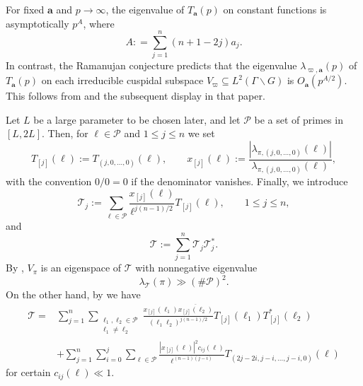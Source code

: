 \documentclass[11pt,oneside]{amsart}
\numberwithin{equation}{section}
\theoremstyle{remark}
\theoremstyle{plain}
\newcommand{\mcP}{\mathcal{P}}
\newcommand{\mcT}{\mathcal{T}}
\newcommand{\ba}{\mathbf{a}}
\newcommand\ov{\overline}
\newcommand\bs{\backslash}
\renewcommand\leq{\leqslant}
\begin{document}
For fixed $\ba$ and $p\to\infty$, the eigenvalue of $T_{\ba}(p)$ on constant functions is asymptotically $p^A$, where
\begin{equation}\label{Hecke-norm}
A: = \sum_{j=1}^n (n+1-2j) a_j.
\end{equation}
In contrast, the Ramanujan conjecture predicts that the eigenvalue $\lambda_{\varpi,\ba}(p)$ of $T_{\ba}(p)$ on each irreducible cuspidal subspace $V_\varpi\subseteq L^2(\Gamma \bs G)$ is $O_\ba(p^{A/2})$. This follows from \cite[(4.3)]{BM-IMRN} and the subsequent display in that paper.

Let $L$ be a large parameter to be chosen later, and let $\mcP$ be a set of primes in $[L,2L]$. Then, for $\ell\in\mcP$ and $1\leq j\leq n$ we set
\[
T_{[j]}(\ell):=T_{(j,0,\dotsc,0)}(\ell),\qquad
x_{[j]}(\ell):=\frac{|\lambda_{\pi,(j,0,\dotsc,0)}(\ell)|}{\lambda_{\pi,(j,0,\dotsc,0)}(\ell)},
\]
with the convention $0/0=0$ if the denominator vanishes. Finally, we introduce
\[
\mcT_j:= \sum_{\ell\in\mcP} \frac{x_{[j]}(\ell)}{\ell^{j(n-1)/2}} T_{[j]}(\ell),\qquad 1\leq j\leq n,
\]
and
\[
\mcT:=\sum_{j=1}^n \mcT_j \mcT_j^{\ast}.
\]
By \cite[Cor.~4.3]{BM-IMRN}, $V_{\pi}$ is an eigenspace of $\mcT$ with nonnegative eigenvalue
\begin{equation}\label{eigen-TT}
\lambda_{\mcT}(\pi)\gg (\#\mcP)^2.
\end{equation}
On the other hand, by \cite[Lem.~4.4]{BM-IMRN} we have
\begin{align*}
\mcT = & \sum_{j=1}^{n} \sum_{\substack{\ell_1,\ell_2\in\mcP \\ \ell_1\neq\ell_2}} \frac{x_{[j]}(\ell_1)\ov{{x}_{[j]}(\ell_2)} }{(\ell_1\ell_2)^{j(n-1)/2}}T_{[j]}(\ell_1)T^{\ast}_{[j]}(\ell_2) \\ & + \sum_{j=1}^{n} \sum_{i=0}^j \sum_{\ell \in \mcP} \frac{|x_{[j]}(\ell)|^2 c_{ij}(\ell)}{\ell^{(n-1)(j-i)}}T_{(2j-2i, j-i, \ldots, j-i, 0)}(\ell)
\end{align*}
for certain $c_{ij}(\ell) \ll 1$. 
\end{document}
